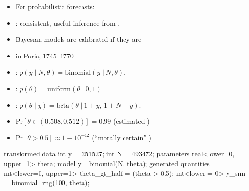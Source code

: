 \documentclass[9pt]{report}
\begin{document}
\begin{itemize}
\item For probabilistic forecasts:
\begin{center}
\end{center}
\item {}: consistent, useful inference from .
\item Bayesian models are calibrated if they are 
\end{itemize}



\begin{itemize}
\item {} in Paris, 1745--1770
\item {}:
$p(y \mid N, \theta)
 = \textrm{binomial}(y \mid N, \theta).$
\item {}:
$p(\theta)
 = \textrm{uniform}(\theta \mid 0, 1)$
\item {}:
$p(\theta \mid y)
 = \textrm{beta}(\theta \mid 1 + y, \ 1 + N - y).$
\vfill
\item {$\textrm{Pr}[\theta \in (0.508, 0.512)] = 0.99$}
\hfill {\small (estimated )}
\item {$\textrm{Pr}[\theta > 0.5] \approx 1 - 10^{-42}$}
\hfill {\small (``morally certain'' )}
\end{itemize}

\begin{stancode}
transformed data {
  int y = 251527;  int N = 493472;
}
parameters {
  real<lower=0, upper=1> theta;
}
model {
  y ~ binomial(N, theta);
}
generated quantities {
  int<lower=0, upper=1> theta_gt_half = (theta > 0.5);
  int<lower = 0> y_sim = binomial_rng(100, theta);
}
\end{stancode}
\end{document}
